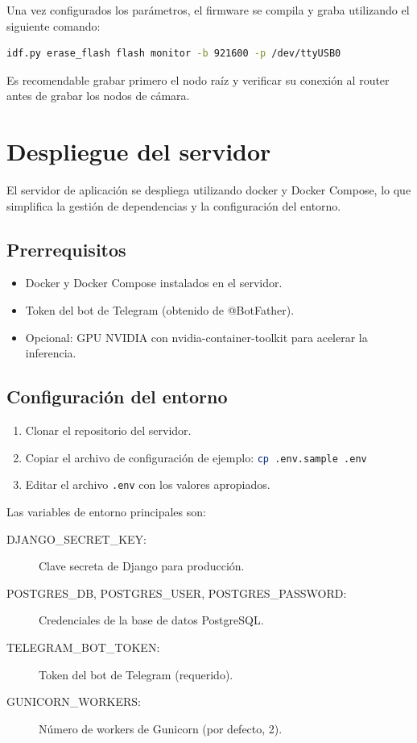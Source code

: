 \documentclass[a4paper, 12pt]{report}
\begin{document}
Una vez configurados los parámetros, el firmware se compila y graba
utilizando el siguiente comando:

\begin{lstlisting}[language=bash, caption={Comandos para compilar y grabar el firmware.}]
  idf.py erase_flash flash monitor -b 921600 -p /dev/ttyUSB0
\end{lstlisting}

Es recomendable grabar primero el nodo raíz y verificar su conexión al
router antes de grabar los nodos de cámara.

\section{Despliegue del servidor}

El servidor de aplicación se despliega utilizando \gls{docker} y
Docker Compose, lo que simplifica la gestión de dependencias y la
configuración del entorno.

\subsection{Prerrequisitos}

\begin{itemize}
  \item Docker y Docker Compose instalados en el servidor.
  \item Token del bot de Telegram (obtenido de @BotFather).
  \item Opcional: GPU NVIDIA con nvidia-container-toolkit para
    acelerar la inferencia.
\end{itemize}

\subsection{Configuración del entorno}

\begin{enumerate}
  \item Clonar el repositorio del servidor.
  \item Copiar el archivo de configuración de ejemplo:
    \lstinline[language=bash]{cp .env.sample .env}
  \item Editar el archivo \texttt{.env} con los valores apropiados.
\end{enumerate}

Las variables de entorno principales son:

\begin{description}
  \item[DJANGO\_\allowbreak SECRET\_\allowbreak KEY:] Clave secreta de Django para producción.
  \item[POSTGRES\_\allowbreak DB, POSTGRES\_\allowbreak USER, POSTGRES\_\allowbreak PASSWORD:] Credenciales
    de la base de datos PostgreSQL.
  \item[TELEGRAM\_\allowbreak BOT\_\allowbreak TOKEN:] Token del bot de Telegram (requerido).
  \item[GUNICORN\_\allowbreak WORKERS:] Número de workers de Gunicorn (por defecto, 2).
\end{description}
\end{document}
